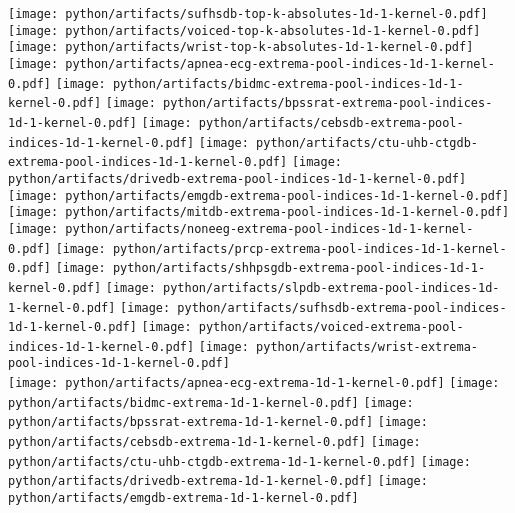 \documentclass[journal]{IEEEtran}
\begin{document}
\begin{figure*}[!t]
	\texttt{[image: python/artifacts/sufhsdb-top-k-absolutes-1d-1-kernel-0.pdf]}
	\texttt{[image: python/artifacts/voiced-top-k-absolutes-1d-1-kernel-0.pdf]}
	\texttt{[image: python/artifacts/wrist-top-k-absolutes-1d-1-kernel-0.pdf]}
	\\
	\texttt{[image: python/artifacts/apnea-ecg-extrema-pool-indices-1d-1-kernel-0.pdf]}
	\texttt{[image: python/artifacts/bidmc-extrema-pool-indices-1d-1-kernel-0.pdf]}
	\texttt{[image: python/artifacts/bpssrat-extrema-pool-indices-1d-1-kernel-0.pdf]}
	\texttt{[image: python/artifacts/cebsdb-extrema-pool-indices-1d-1-kernel-0.pdf]}
	\texttt{[image: python/artifacts/ctu-uhb-ctgdb-extrema-pool-indices-1d-1-kernel-0.pdf]}
	\texttt{[image: python/artifacts/drivedb-extrema-pool-indices-1d-1-kernel-0.pdf]}
	\texttt{[image: python/artifacts/emgdb-extrema-pool-indices-1d-1-kernel-0.pdf]}
	\texttt{[image: python/artifacts/mitdb-extrema-pool-indices-1d-1-kernel-0.pdf]}
	\texttt{[image: python/artifacts/noneeg-extrema-pool-indices-1d-1-kernel-0.pdf]}
	\texttt{[image: python/artifacts/prcp-extrema-pool-indices-1d-1-kernel-0.pdf]}
	\texttt{[image: python/artifacts/shhpsgdb-extrema-pool-indices-1d-1-kernel-0.pdf]}
	\texttt{[image: python/artifacts/slpdb-extrema-pool-indices-1d-1-kernel-0.pdf]}
	\texttt{[image: python/artifacts/sufhsdb-extrema-pool-indices-1d-1-kernel-0.pdf]}
	\texttt{[image: python/artifacts/voiced-extrema-pool-indices-1d-1-kernel-0.pdf]}
	\texttt{[image: python/artifacts/wrist-extrema-pool-indices-1d-1-kernel-0.pdf]}
	\\
	\texttt{[image: python/artifacts/apnea-ecg-extrema-1d-1-kernel-0.pdf]}
	\texttt{[image: python/artifacts/bidmc-extrema-1d-1-kernel-0.pdf]}
	\texttt{[image: python/artifacts/bpssrat-extrema-1d-1-kernel-0.pdf]}
	\texttt{[image: python/artifacts/cebsdb-extrema-1d-1-kernel-0.pdf]}
	\texttt{[image: python/artifacts/ctu-uhb-ctgdb-extrema-1d-1-kernel-0.pdf]}
	\texttt{[image: python/artifacts/drivedb-extrema-1d-1-kernel-0.pdf]}
	\texttt{[image: python/artifacts/emgdb-extrema-1d-1-kernel-0.pdf]}

\end{figure*}
\end{document}
